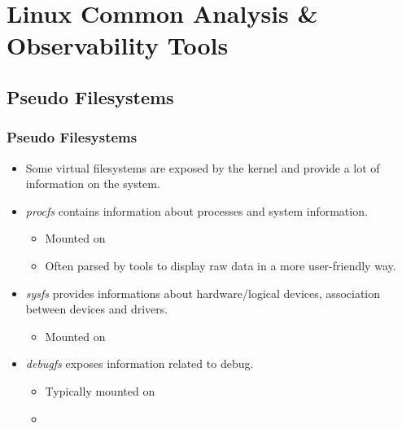 \section{Linux Common Analysis \& Observability Tools}

\subsection{Pseudo Filesystems}

\begin{frame}
  \frametitle{Pseudo Filesystems}
  \begin{itemize}
    \item Some virtual filesystems are exposed by the kernel and provide a lot
          of information on the system.
    \item {\em procfs} contains information about processes and system
          information.
    \begin{itemize}
      \item Mounted on 
      \item Often parsed by tools to display raw data in a more user-friendly
            way.
    \end{itemize}
    \item {\em sysfs} provides informations about hardware/logical devices,
          association between devices and drivers.
    \begin{itemize}
      \item Mounted on 
    \end{itemize}
    \item {\em debugfs} exposes information related to debug.
    \begin{itemize}
      \item Typically mounted on 
      \item {}
    \end{itemize}
  \end{itemize}
\end{frame}

